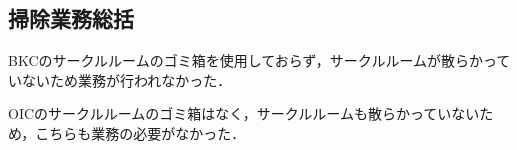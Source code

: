 \subsection*{掃除業務総括}


BKCのサークルルームのゴミ箱を使用しておらず，サークルルームが散らかっていないため業務が行われなかった．

OICのサークルルームのゴミ箱はなく，サークルルームも散らかっていないため，こちらも業務の必要がなかった．
